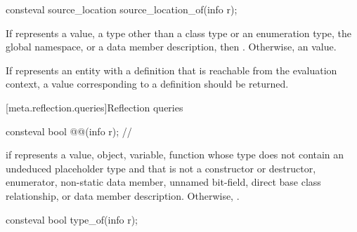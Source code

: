%
\begin{itemdecl}
consteval source_location source_location_of(info r);
\end{itemdecl}

\begin{itemdescr}
\pnum
\returns
If  represents
a value,
a type other than a class type or an enumeration type,
the global namespace, or
a data member description,
then .
Otherwise, an
 value.

\pnum
\recommended
If  represents an entity with a definition
that is reachable from the evaluation context,
a value corresponding to a definition should be returned.
\end{itemdescr}

[meta.reflection.queries]{Reflection queries}

\begin{itemdecl}
consteval bool @@(info r);  // \expos
\end{itemdecl}

\begin{itemdescr}
\pnum
\returns
{} if  represents a
value,
object,
variable,
function whose type does not contain an undeduced placeholder type
and that is not a constructor or destructor,
enumerator,
non-static data member,
unnamed bit-field,
direct base class relationship, or
data member description.
Otherwise, .
\end{itemdescr}

%
\begin{itemdecl}
consteval bool type_of(info r);
\end{itemdecl}


